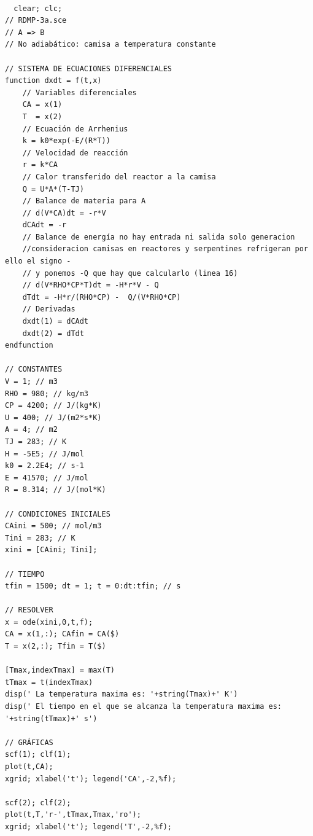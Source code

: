 \documentclass{report}
\begin{document}
\begin{verbatim}

  clear; clc; 
// RDMP-3a.sce
// A => B
// No adiabático: camisa a temperatura constante

// SISTEMA DE ECUACIONES DIFERENCIALES
function dxdt = f(t,x)
    // Variables diferenciales
    CA = x(1)
    T  = x(2)
    // Ecuación de Arrhenius
    k = k0*exp(-E/(R*T))
    // Velocidad de reacción
    r = k*CA
    // Calor transferido del reactor a la camisa
    Q = U*A*(T-TJ)
    // Balance de materia para A
    // d(V*CA)dt = -r*V
    dCAdt = -r                             
    // Balance de energía no hay entrada ni salida solo generacion 
    //consideracion camisas en reactores y serpentines refrigeran por ello el signo -
    // y ponemos -Q que hay que calcularlo (linea 16)
    // d(V*RHO*CP*T)dt = -H*r*V - Q
    dTdt = -H*r/(RHO*CP) -  Q/(V*RHO*CP)   
    // Derivadas
    dxdt(1) = dCAdt
    dxdt(2) = dTdt
endfunction

// CONSTANTES
V = 1; // m3
RHO = 980; // kg/m3
CP = 4200; // J/(kg*K)
U = 400; // J/(m2*s*K)
A = 4; // m2
TJ = 283; // K
H = -5E5; // J/mol
k0 = 2.2E4; // s-1
E = 41570; // J/mol
R = 8.314; // J/(mol*K)

// CONDICIONES INICIALES
CAini = 500; // mol/m3
Tini = 283; // K
xini = [CAini; Tini];

// TIEMPO
tfin = 1500; dt = 1; t = 0:dt:tfin; // s

// RESOLVER
x = ode(xini,0,t,f);
CA = x(1,:); CAfin = CA($)
T = x(2,:); Tfin = T($)

[Tmax,indexTmax] = max(T)
tTmax = t(indexTmax)
disp(' La temperatura maxima es: '+string(Tmax)+' K')
disp(' El tiempo en el que se alcanza la temperatura maxima es: '+string(tTmax)+' s')

// GRÁFICAS
scf(1); clf(1); 
plot(t,CA);
xgrid; xlabel('t'); legend('CA',-2,%f);

scf(2); clf(2); 
plot(t,T,'r-',tTmax,Tmax,'ro');
xgrid; xlabel('t'); legend('T',-2,%f);
\end{verbatim}
\end{document}
